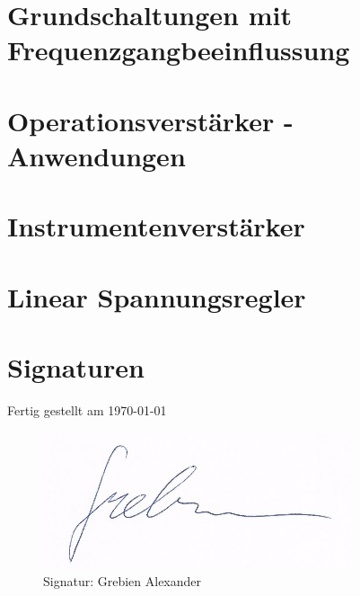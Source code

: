 \chapter{Grundschaltungen mit Frequenzgangbeeinflussung}


\chapter{Operationsverstärker - Anwendungen}


\chapter{Instrumentenverstärker}


\chapter{Linear Spannungsregler}


\newpage
\chapter{Signaturen}
    Fertig gestellt am \today \\
    \begin{figure}[H]
        \centering
        \includegraphics{pics/signature_grebien.png}
    	\caption{Signatur: Grebien Alexander}
    	\label{pic:signatur_grebien}
    \end{figure}
        
\listoffigures
\listoftables


